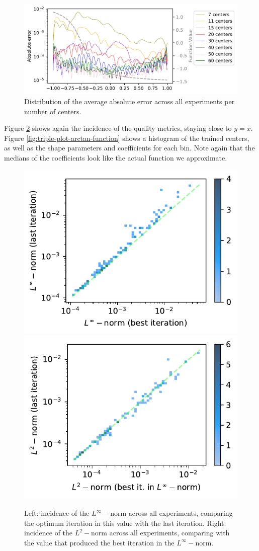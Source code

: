 \documentclass[12pt]{report} %
\begin{document}
\begin{figure}
  \includegraphics[width=\textwidth]{imagenes/experiments/1d/statistical_1d_full_scheduler_interpolation/arctan_paper/arctan_paper_avg_error.pdf}
  \caption{Distribution of the average absolute error across all experiments per number of centers.}
  \label{fig:distribution-avg-absolute-error-arctan}
\end{figure}

Figure \ref{fig:incidence-l-arctan-function} shows again the incidence of the quality metrics, staying close to $y=x$. Figure \ref{fig:triple-plot-arctan-function} shows a histogram of the trained centers, as well as the shape parameters and coefficients for each bin. Note again that the medians of the coefficients look like the actual function we approximate.

\begin{figure}
  \includegraphics[width=.45\textwidth]{imagenes/experiments/1d/statistical_1d_full_scheduler_interpolation/arctan_paper/incidence_of_linf_arctan_paper.pdf}
  \includegraphics[width=.45\textwidth]{imagenes/experiments/1d/statistical_1d_full_scheduler_interpolation/arctan_paper/incidence_of_l2_arctan_paper.pdf}
  \caption{Left: incidence of the $L^\infty-$norm across all experiments, comparing the optimum iteration in this value with the last iteration. Right: incidence of the $L^2-$norm across all experiments, comparing with the value that produced the best iteration in the $L^\infty-$norm.}
  \label{fig:incidence-l-arctan-function}
\end{figure}
\end{document}
